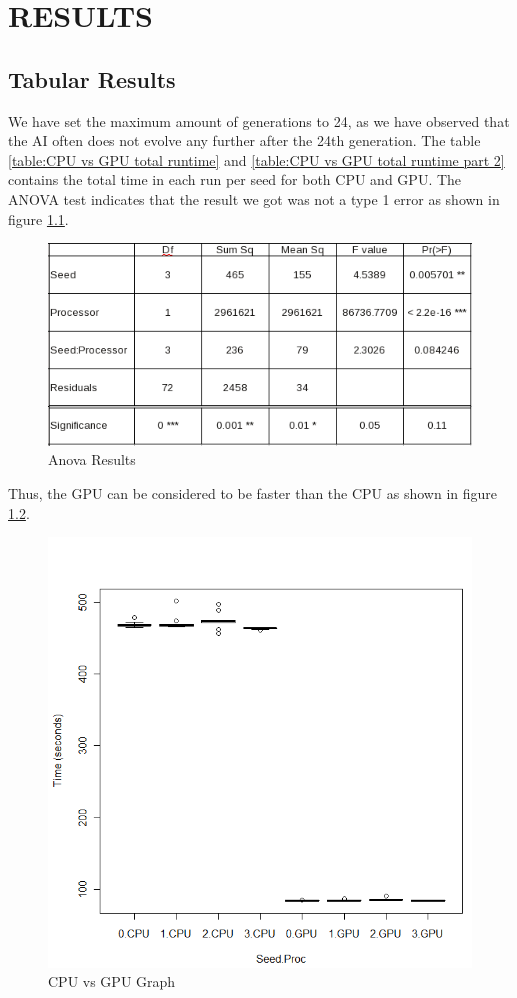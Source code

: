\chapter{RESULTS}
\section{Tabular Results} 
We have set the maximum amount of generations to 24, as we have observed 
that the AI often does not evolve any further after the 24th generation. The 
table \ref{table:CPU vs GPU total runtime} and 
\ref{table:CPU vs GPU total runtime part 2} contains the total time in each
run per seed for both CPU and GPU. The ANOVA test indicates that the result
we got was not a type 1 error as shown in figure \ref{fig:anova_result}.
\begin{figure}
	\centering
		\graphicspath{{images/}}
		\includegraphics[width=260 pt]{Anova_Results.png}
	\caption{Anova Results}
	\label{fig:anova_result}
\end{figure}
Thus, the GPU can be considered to be faster than the CPU as shown in figure
\ref{fig:anova_result_graph}.
\begin{figure}
	\centering
		\graphicspath{{images/}}
		\includegraphics[width=260 pt]{Anova_Result_Graph.png}
	\caption{CPU vs GPU Graph}
	\label{fig:anova_result_graph}
\end{figure}

